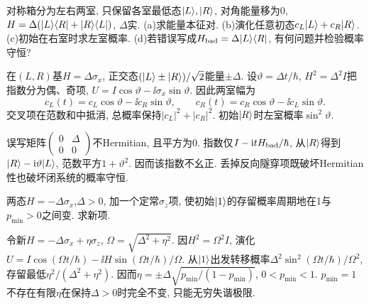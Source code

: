 \begin{exercise}
对称箱分为左右两室, 只保留各室最低态$\lvert L\rangle,\lvert R\rangle$, 对角能量移为0, $H=\Delta(\lvert L\rangle\langle R\rvert+\lvert R\rangle\langle L\rvert)$, $\Delta$实. (a)求能量本征对. (b)演化任意初态$c_L\lvert L\rangle+c_R\lvert R\rangle$. (c)初始在右室时求左室概率. (d)若错误写成$H_{\rm bad}=\Delta\lvert L\rangle\langle R\rvert$, 有何问题并检验概率守恒?
\end{exercise}
\begin{solution}
在$(L,R)$基$H=\Delta\sigma_x$, 正交态$(\lvert L\rangle\pm\lvert R\rangle)/\sqrt2$能量$\pm\Delta$. 设$\vartheta=\Delta t/\hbar$, $H^2=\Delta^2I$把指数分为偶、奇项, $U=I\cos\vartheta-\ii\sigma_x\sin\vartheta$. 因此两室幅为
\[
c_L(t)=c_L\cos\vartheta-\ii c_R\sin\vartheta,\qquad
c_R(t)=c_R\cos\vartheta-\ii c_L\sin\vartheta.
\]
交叉项在范数和中抵消, 总概率保持$|c_L|^2+|c_R|^2$. 初始$\lvert R\rangle$时左室概率$\sin^2\vartheta$.

误写矩阵$\begin{pmatrix}0&\Delta\\0&0\end{pmatrix}$不Hermitian, 且平方为0. 指数仅$I-\mathrm i tH_{\rm bad}/\hbar$, 从$\lvert R\rangle$得到$\lvert R\rangle-\mathrm i\vartheta\lvert L\rangle$, 范数平方$1+\vartheta^2$. 因而该指数不幺正. 丢掉反向隧穿项既破坏Hermitian性也破坏闭系统的概率守恒.
\end{solution}
\begin{exercise}
两态$H=-\Delta\sigma_x$,$\Delta>0$, 加一个定常$\sigma_z$项, 使初始$\lvert 1\rangle$的存留概率周期地在1与$p_{\min}>0$之间变. 求新项.
\end{exercise}
\begin{solution}
令新$H=-\Delta\sigma_x+\eta\sigma_z$, $\Omega=\sqrt{\Delta^2+\eta^2}$. 因$H^2=\Omega^2I$, 演化$U=I\cos(\Omega t/\hbar)-\ii H\sin(\Omega t/\hbar)/\Omega$. 从$\lvert 1\rangle$出发转移概率$\Delta^2\sin^2(\Omega t/\hbar)/\Omega^2$, 存留最低$\eta^2/(\Delta^2+\eta^2)$. 因而$\eta=\pm\Delta\sqrt{p_{\min}/(1-p_{\min})}$, $0<p_{\min}<1$. $p_{\min}=1$不存在有限$\eta$在保持$\Delta>0$时完全不变, 只能无穷失谐极限.
\end{solution}

